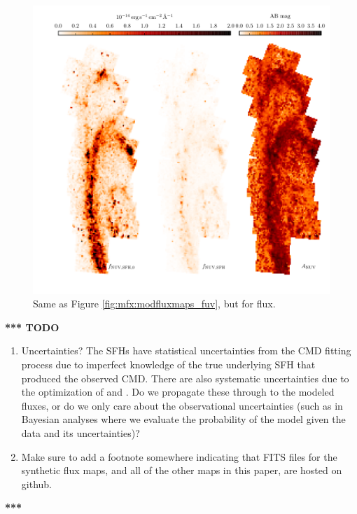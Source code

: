 \begin{figure}
\centering
\includegraphics[width=\textwidth]{m31flux-figures/modfluxmaps_nuv.pdf}
\caption[\nuv{} flux map modeled from the SFHs.]{Same as Figure
    \ref{fig:mfx:modfluxmaps_fuv}, but for \nuv{} flux.
}
\label{fig:mfx:modfluxmaps_nuv}
\end{figure}

\textbf{*** TODO}

\begin{enumerate}
\item Uncertainties? The SFHs have statistical uncertainties from the CMD
    fitting process due to imperfect knowledge of the true underlying SFH that
    produced the observed CMD. There are also systematic uncertainties due to
    the optimization of \avf{} and \dav{}. Do we propagate these through to the
    modeled fluxes, or do we only care about the observational uncertainties
    (such as in Bayesian analyses where we evaluate the probability of the
    model given the data and its uncertainties)?
\item Make sure to add a footnote somewhere indicating that FITS files for the
    synthetic flux maps, and all of the other maps in this paper, are hosted on
    github.
\end{enumerate}

\textbf{***}





